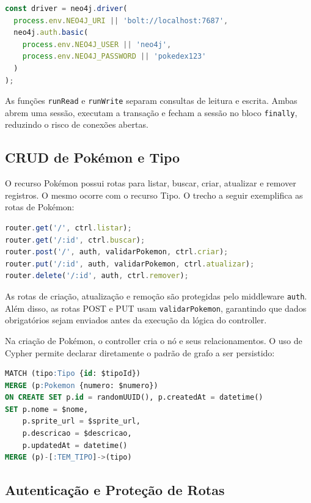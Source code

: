 \documentclass[12pt]{article}
\begin{document}
\begin{lstlisting}[language=JavaScript]
const driver = neo4j.driver(
  process.env.NEO4J_URI || 'bolt://localhost:7687',
  neo4j.auth.basic(
    process.env.NEO4J_USER || 'neo4j',
    process.env.NEO4J_PASSWORD || 'pokedex123'
  )
);
\end{lstlisting}

As funções \texttt{runRead} e \texttt{runWrite} separam consultas de leitura e escrita. Ambas abrem uma sessão, executam a transação e fecham a sessão no bloco \texttt{finally}, reduzindo o risco de conexões abertas.

\subsection{CRUD de Pokémon e Tipo}

O recurso Pokémon possui rotas para listar, buscar, criar, atualizar e remover registros. O mesmo ocorre com o recurso Tipo. O trecho a seguir exemplifica as rotas de Pokémon:

\begin{lstlisting}[language=JavaScript]
router.get('/', ctrl.listar);
router.get('/:id', ctrl.buscar);
router.post('/', auth, validarPokemon, ctrl.criar);
router.put('/:id', auth, validarPokemon, ctrl.atualizar);
router.delete('/:id', auth, ctrl.remover);
\end{lstlisting}

As rotas de criação, atualização e remoção são protegidas pelo middleware \texttt{auth}. Além disso, as rotas POST e PUT usam \texttt{validarPokemon}, garantindo que dados obrigatórios sejam enviados antes da execução da lógica do controller.

Na criação de Pokémon, o controller cria o nó e seus relacionamentos. O uso de Cypher permite declarar diretamente o padrão de grafo a ser persistido:

\begin{lstlisting}[language=SQL]
MATCH (tipo:Tipo {id: $tipoId})
MERGE (p:Pokemon {numero: $numero})
ON CREATE SET p.id = randomUUID(), p.createdAt = datetime()
SET p.nome = $nome,
    p.sprite_url = $sprite_url,
    p.descricao = $descricao,
    p.updatedAt = datetime()
MERGE (p)-[:TEM_TIPO]->(tipo)
\end{lstlisting}

\subsection{Autenticação e Proteção de Rotas}
\end{document}
